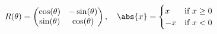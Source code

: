 \begin{frame}

	\begin{align*}
		R(\theta) = \begin{pmatrix}
			\cos(\theta) & -\sin(\theta)\\
			\sin(\theta) & \cos(\theta)
		\end{pmatrix},\quad
		\abs{x} = \begin{cases}
			x & \text{if $ x \geq 0$}\\
			-x & \text{if $ x < 0$}
		\end{cases}
	\end{align*}
\end{frame}





